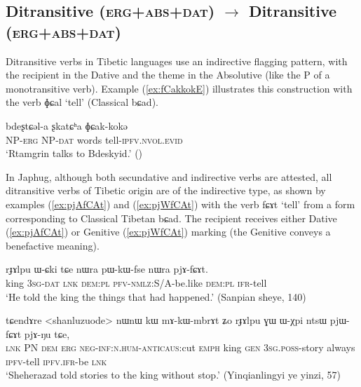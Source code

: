 \documentclass[oldfontcommands,oneside,a4paper,11pt]{article}
\newcommand{\ipa}[1]{{\phon \mbox{#1}}} %
\newcommand{\refb}[1]{(\ref{#1})}
\begin{document}
  \subsection{Ditransitive (\textsc{erg+abs+dat})  $\rightarrow$ Ditransitive (\textsc{erg+abs+dat})}
Ditransitive verbs in Tibetic languages use an indirective flagging pattern, with the recipient in the Dative and the theme in the Absolutive (like the P of a monotransitive verb). Example \refb{ex:fCakkokE} illustrates this construction with the verb \ipa{ɸɕal} `tell' (Classical \ipa{bɕad}).

\begin{exe}
\ex \label{ex:fCakkokE}
\gll \ipa{ʂtamɖʐən-ɣə}  \ipa{bdeʂtɕəl-a} \ipa{ʂkatɕʰa} \ipa{ɸɕak-kokə} \\
NP-\textsc{erg} NP-\textsc{dat} words tell-\textsc{ipfv.nvol.evid} \\
\glt `Rtamgrin talks to Bdeskyid.' (\citealt[87, ex. 195]{haller04themchen})
\end{exe}

In Japhug, although both secundative and indirective verbs are attested, all ditransitive verbs of Tibetic origin are of the indirective type, as shown by examples \refb{ex:pjAfCAt} and \refb{ex:pjWfCAt} with the verb \ipa{fɕɤt} `tell' from a form corresponding to Classical Tibetan \ipa{bɕad}. The recipient receives either Dative (\ref{ex:pjAfCAt}) or Genitive (\ref{ex:pjWfCAt}) marking (the Genitive conveys a benefactive meaning).

\begin{exe}
\ex \label{ex:pjAfCAt}
\gll
  \ipa{rɟɤlpu} 	\ipa{ɯ-ɕki} 	\ipa{tɕe} 	\ipa{nɯra} 	\ipa{pɯ-kɯ-fse} 	\ipa{nɯra} 	\ipa{pjɤ-fɕɤt.} \\
  king \textsc{3sg-dat} \textsc{lnk} \textsc{dem:pl} \textsc{pfv-nmlz}:S/A-be.like  \textsc{dem:pl} \textsc{ifr}-tell \\
  \glt `He told the king the things that had happened.' (Sanpian sheye, 140)
\end{exe}

\begin{exe}
\ex \label{ex:pjWfCAt}
\gll
  \ipa{tɕendɤre} 	<shanluzuode> 	\ipa{nɯnɯ} 	\ipa{kɯ} 	\ipa{mɤ-kɯ-mbrɤt} 	\ipa{ʑo} 	\ipa{rɟɤlpu} 	\ipa{ɣɯ} 	\ipa{ɯ-χpi} 	\ipa{ntsɯ} 	\ipa{pjɯ-fɕɤt} 	\ipa{pjɤ-ŋu} 	\ipa{tɕe,} \\
  \textsc{lnk} PN \textsc{dem} \textsc{erg} \textsc{neg-inf:n.hum}-\textsc{anticaus}:cut \textsc{emph} king \textsc{gen} \textsc{3sg.poss}-story always \textsc{ipfv}-tell \textsc{ipfv.ifr}-be \textsc{lnk} \\
\glt `Sheherazad told stories to the king without stop.' (Yinqianlingyi ye yinzi, 57)
\end{exe}
\end{document}
